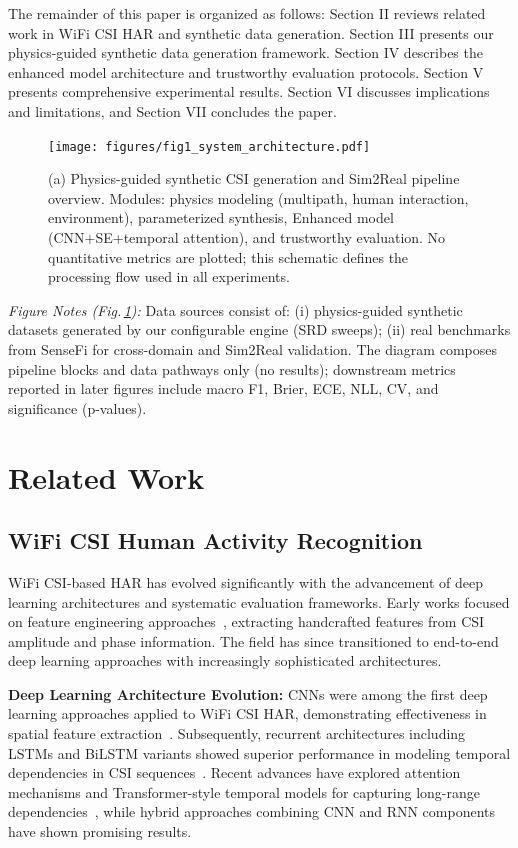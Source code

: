 \documentclass[journal]{IEEEtran}
\begin{document}
The remainder of this paper is organized as follows: Section II reviews related work in WiFi CSI HAR and synthetic data generation. Section III presents our physics-guided synthetic data generation framework. Section IV describes the enhanced model architecture and trustworthy evaluation protocols. Section V presents comprehensive experimental results. Section VI discusses implications and limitations, and Section VII concludes the paper.

\begin{figure}[t]
\centering
\texttt{[image: figures/fig1\_system\_architecture.pdf]}
\caption{(a) Physics-guided synthetic CSI generation and Sim2Real pipeline overview. Modules: physics modeling (multipath, human interaction, environment), parameterized synthesis, Enhanced model (CNN+SE+temporal attention), and trustworthy evaluation. No quantitative metrics are plotted; this schematic defines the processing flow used in all experiments.}
\label{fig:system_overview}
\end{figure}

\noindent\textit{Figure Notes (Fig.\,\ref{fig:system_overview}):} Data sources consist of: (i) physics-guided synthetic datasets generated by our configurable engine (SRD sweeps); (ii) real benchmarks from SenseFi for cross-domain and Sim2Real validation. The diagram composes pipeline blocks and data pathways only (no results); downstream metrics reported in later figures include macro F1, Brier, ECE, NLL, CV, and significance (p-values).


\section{Related Work}

\subsection{WiFi CSI Human Activity Recognition}

WiFi CSI-based HAR has evolved significantly with the advancement of deep learning architectures and systematic evaluation frameworks. Early works focused on feature engineering approaches~\cite{csi_basics2016}, extracting handcrafted features from CSI amplitude and phase information. The field has since transitioned to end-to-end deep learning approaches with increasingly sophisticated architectures.

\textbf{Deep Learning Architecture Evolution:} CNNs were among the first deep learning approaches applied to WiFi CSI HAR, demonstrating effectiveness in spatial feature extraction~\cite{clnet2021}. Subsequently, recurrent architectures including LSTMs and BiLSTM variants showed superior performance in modeling temporal dependencies in CSI sequences~\cite{rewis2022}. Recent advances have explored attention mechanisms and Transformer-style temporal models for capturing long-range dependencies~\cite{gulati2020conformer,li2020tea,bertasius2021timesformer,lim2021tft,zhou2021informer}, while hybrid approaches combining CNN and RNN components have shown promising results.
\end{document}

